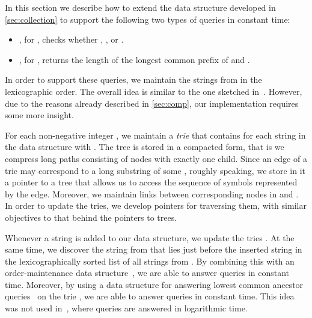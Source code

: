 \documentclass[a4paper]{article}
\theoremstyle{remark}
\begin{document}
\newcommand{\prevst}{\mathtt{prev}}
\newcommand{\succst}{\mathtt{succ}}
\newcommand{\findst}{\mathtt{find}}
\newcommand{\insertst}{\mathtt{insert}}
\newcommand{\nilst}{\mathtt{nil}}
\newcommand{\sub}{\subseteq}
\newcommand{\sm}{\setminus}
\newcommand{\utrie}{\overline{T}}
\newcommand{\trie}{T}

\newcommand{\tval}{\mathtt{val}}
\newcommand{\tlink}{\mathtt{link}}
\newcommand{\tleaf}{\mathtt{leaf}}
\newcommand{\tsub}{\mathtt{sub}}
\newcommand{\tlca}{\mathtt{lca}}
\newcommand{\troot}{\mathtt{root}}
\newcommand{\tdepth}{\mathtt{depth}}
\newcommand{\tup}{\mathtt{up}}
\newcommand{\tdown}{\mathtt{down}}
\newcommand{\tmake}{\mathtt{make\_explicit}}
\newcommand{\taddleaf}{\mathtt{add\_leaf}}


In this section we describe how to extend the data structure developed in \cref{sec:collection} to support the following two types of queries
in constant time:
\begin{itemize}
  \item , for ,  checks whether ,
    , or .
  \item , for , returns the length of the longest common prefix
    of  and .
\end{itemize}

In order to support these queries, we maintain the strings from  in the lexicographic order.
The overall idea is similar to the one sketched in~\cite{Alstrup}.
However, due to the reasons already described in \cref{sec:comp}, our implementation requires some more insight.

For each non-negative integer , we maintain a \emph{trie}  that contains  for each string  in the data structure
with .
The tree is stored in a compacted form, that is we compress long paths consisting of nodes with exactly one child.
Since an edge of a trie may correspond to a long substring of some , roughly speaking, we store in it a pointer to a tree  that allows us to access the sequence of symbols represented by the edge.
Moreover, we maintain links between corresponding nodes in  and .
In order to update the tries, we develop pointers for traversing them, with similar objectives to that behind the pointers to  trees.

Whenever a string is added to our data structure, we update the tries .
At the same time, we discover the string from  that lies just before the inserted string in the lexicographically sorted list of all strings from .
By combining this with an order-maintenance data structure~\cite{Dietz:1987,Bender:2002}, we are able to answer  queries in constant time.
Moreover, by using a data structure for answering lowest common ancestor queries~\cite{Cole:2005} on the trie , we are able to answer  queries in constant time.
This idea was not used in~\cite{Alstrup}, where  queries are answered in logarithmic time.
\end{document}
